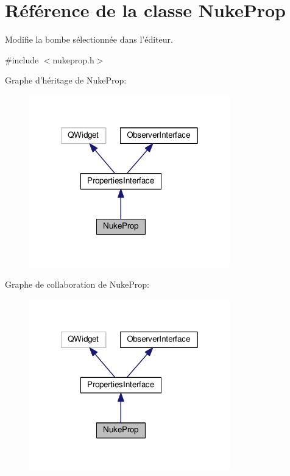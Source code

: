 \hypertarget{classNukeProp}{\section{Référence de la classe Nuke\+Prop}
\label{classNukeProp}
}


Modifie la bombe sélectionnée dans l’éditeur.  




{\ttfamily \#include $<$nukeprop.\+h$>$}



Graphe d'héritage de Nuke\+Prop\+:\nopagebreak
\begin{figure}[H]
\begin{center}
\leavevmode
\includegraphics[width=247pt]{dc/d49/classNukeProp__inherit__graph}
\end{center}
\end{figure}


Graphe de collaboration de Nuke\+Prop\+:\nopagebreak
\begin{figure}[H]
\begin{center}
\leavevmode
\includegraphics[width=247pt]{d0/db8/classNukeProp__coll__graph}
\end{center}
\end{figure}
